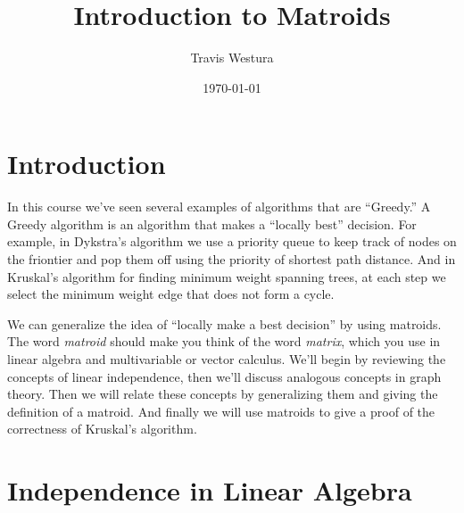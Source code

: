 \documentclass[twoside]{article}
\title{Introduction to Matroids}
\author{Travis Westura}
\date{\today}
\begin{document}
\maketitle
\thispagestyle{empty}

\section{Introduction}

In this course we've seen several examples of algorithms that are ``Greedy.''
A Greedy algorithm is an algorithm that makes a ``locally best'' decision.
For example, in Dykstra's algorithm we use a priority queue to keep track of nodes on the friontier and pop them off using the priority of shortest path distance.
And in Kruskal's algorithm for finding minimum weight spanning trees, at each step we select the minimum weight edge that does not form a cycle.

We can generalize the idea of ``locally make a best decision'' by using matroids.
The word \emph{matroid} should make you think of the word \emph{matrix}, which you use in linear algebra and multivariable or vector calculus.
We'll begin by reviewing the concepts of linear independence, then we'll discuss analogous concepts in graph theory.
Then we will relate these concepts by generalizing them and giving the definition of a matroid.
And finally we will use matroids to give a proof of the correctness of Kruskal's algorithm.

\section{Independence in Linear Algebra}
\end{document}
